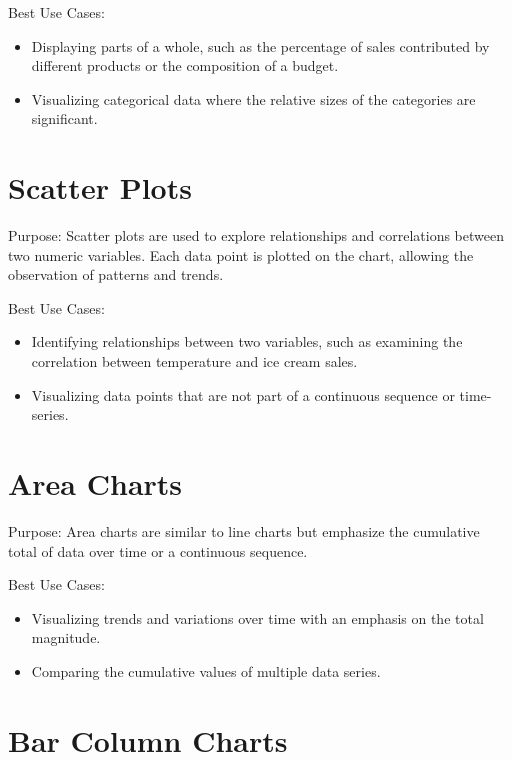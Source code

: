 \documentclass[
]{book}
\providecommand{\tightlist}{%
  \setlength{\itemsep}{0pt}\setlength{\parskip}{0pt}}
\begin{document}
Best Use Cases:

\begin{itemize}
\tightlist
\item
  Displaying parts of a whole, such as the percentage of sales contributed by different products or the composition of a budget.
\item
  Visualizing categorical data where the relative sizes of the categories are significant.
\end{itemize}

\hypertarget{scatter-plots}{%
\section{Scatter Plots}\label{scatter-plots}}

Purpose: Scatter plots are used to explore relationships and correlations between two numeric variables. Each data point is plotted on the chart, allowing the observation of patterns and trends.

Best Use Cases:

\begin{itemize}
\tightlist
\item
  Identifying relationships between two variables, such as examining the correlation between temperature and ice cream sales.
\item
  Visualizing data points that are not part of a continuous sequence or time-series.
\end{itemize}

\hypertarget{area-charts}{%
\section{Area Charts}\label{area-charts}}

Purpose: Area charts are similar to line charts but emphasize the cumulative total of data over time or a continuous sequence.

Best Use Cases:

\begin{itemize}
\tightlist
\item
  Visualizing trends and variations over time with an emphasis on the total magnitude.
\item
  Comparing the cumulative values of multiple data series.
\end{itemize}

\hypertarget{bar-column-charts}{%
\section{Bar Column Charts}\label{bar-column-charts}}
\end{document}
